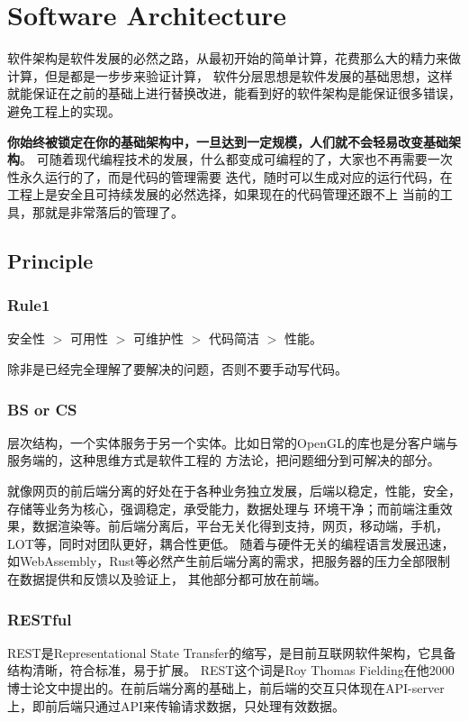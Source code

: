 \chapter{Software Architecture}

软件架构是软件发展的必然之路，从最初开始的简单计算，花费那么大的精力来做计算，但是都是一步步来验证计算，
软件分层思想是软件发展的基础思想，这样就能保证在之前的基础上进行替换改进，能看到好的软件架构是能保证很多错误，
避免工程上的实现。

\textbf{你始终被锁定在你的基础架构中，一旦达到一定规模，人们就不会轻易改变基础架构}。
可随着现代编程技术的发展，什么都变成可编程的了，大家也不再需要一次性永久运行的了，而是代码的管理需要
迭代，随时可以生成对应的运行代码，在工程上是安全且可持续发展的必然选择，如果现在的代码管理还跟不上
当前的工具，那就是非常落后的管理了。

\section{Principle}

\subsection{Rule1}

安全性 $>$ 可用性 $>$ 可维护性 $>$ 代码简洁 $>$ 性能。

除非是已经完全理解了要解决的问题，否则不要手动写代码。

\subsection{BS or CS}
层次结构，一个实体服务于另一个实体。比如日常的OpenGL的库也是分客户端与服务端的，这种思维方式是软件工程的
方法论，把问题细分到可解决的部分。

就像网页的前后端分离的好处在于各种业务独立发展，后端以稳定，性能，安全，存储等业务为核心，强调稳定，承受能力，数据处理与
环境干净；而前端注重效果，数据渲染等。前后端分离后，平台无关化得到支持，网页，移动端，手机，LOT等，同时对团队更好，耦合性更低。
随着与硬件无关的编程语言发展迅速，如WebAssembly，Rust等必然产生前后端分离的需求，把服务器的压力全部限制在数据提供和反馈以及验证上，
其他部分都可放在前端。

\subsection{RESTful}
REST是Representational State Transfer的缩写，是目前互联网软件架构，它具备结构清晰，符合标准，易于扩展。
REST这个词是Roy Thomas Fielding在他2000博士论文中提出的。在前后端分离的基础上，前后端的交互只体现在API-server
上，即前后端只通过API来传输请求数据，只处理有效数据。

